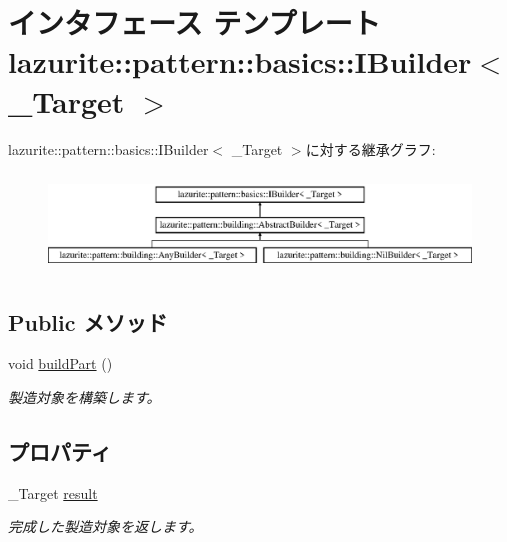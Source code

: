 \hypertarget{interfacelazurite_1_1pattern_1_1basics_1_1_i_builder_3_01___target_01_4}{
\section{インタフェース テンプレート lazurite::pattern::basics::IBuilder$<$ \_\-Target $>$}
\label{interfacelazurite_1_1pattern_1_1basics_1_1_i_builder_3_01___target_01_4}
}
lazurite::pattern::basics::IBuilder$<$ \_\-Target $>$に対する継承グラフ:\begin{figure}[H]
\begin{center}
\leavevmode
\includegraphics[height=2.65823cm]{interfacelazurite_1_1pattern_1_1basics_1_1_i_builder_3_01___target_01_4}
\end{center}
\end{figure}
\subsection*{Public メソッド}
\begin{DoxyCompactItemize}
\item 
void \hyperlink{interfacelazurite_1_1pattern_1_1basics_1_1_i_builder_3_01___target_01_4_a5013ac4acdb3873bf0c7bd34803d94e0}{buildPart} ()
\begin{DoxyCompactList}\small\item\em 製造対象を構築します。 \item\end{DoxyCompactList}\end{DoxyCompactItemize}
\subsection*{プロパティ}
\begin{DoxyCompactItemize}
\item 
\_\-Target \hyperlink{interfacelazurite_1_1pattern_1_1basics_1_1_i_builder_3_01___target_01_4_a7955fa44ef66bbe59f764a300001cead}{result}
\begin{DoxyCompactList}\small\item\em 完成した製造対象を返します。 \item\end{DoxyCompactList}\end{DoxyCompactItemize}


